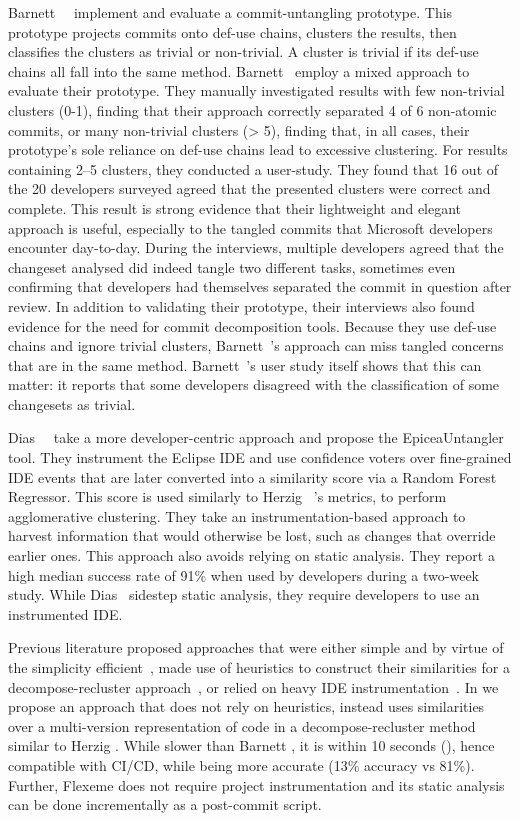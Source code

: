 Barnett~\etal~\cite{Barnett2015} implement and evaluate a commit-untangling
prototype. This prototype projects commits onto def-use chains, clusters the
results, then classifies the clusters as trivial or non-trivial. A cluster is
trivial if its def-use chains all fall into the same method. Barnett~\etal
employ a mixed approach to evaluate their prototype. They manually investigated
results with few non-trivial clusters (0-1), finding that their approach
correctly separated 4 of 6 non-atomic commits,  or many non-trivial clusters (>
5), finding that, in all cases, their prototype's sole reliance on def-use
chains lead to excessive clustering. For results containing 2--5 clusters, they
conducted a user-study. They found that 16 out of the 20 developers surveyed
agreed that the presented clusters were correct and complete. This result is
strong evidence that their lightweight and elegant approach is useful,
especially to the tangled commits that Microsoft developers encounter
day-to-day. During the interviews, multiple developers agreed that the changeset
analysed did indeed tangle two different tasks, sometimes even confirming that
developers had themselves separated the commit in question after review. In
addition to validating their prototype, their interviews also found evidence for
the need for commit decomposition tools. Because they use def-use chains and
ignore trivial clusters, Barnett~\etal's approach can miss tangled concerns that
are in the same method. Barnett~\etal's user study itself shows that this can
matter: it reports that some developers disagreed with the classification of
some changesets as trivial.

Dias~\etal~\cite{Dias2015} take a more developer-centric approach and propose
the EpiceaUntangler tool. They instrument the Eclipse IDE and use confidence
voters over fine-grained IDE events that are later converted into a similarity
score via a Random Forest Regressor. This score is used similarly to Herzig
\etal~\cite{Herzig2016}'s metrics, \ie to perform agglomerative clustering. They
take an instrumentation-based approach to harvest information that would
otherwise be lost, such as changes that override earlier ones. This approach
also avoids relying on static analysis. They report a high median success rate
of 91\% when used by developers during a two-week study. While Dias~\etal
sidestep static analysis, they require developers to use an instrumented IDE.

Previous literature proposed approaches that were either simple and by virtue of
the simplicity efficient~\cite{Barnett2015}, made use of heuristics to construct
their similarities for a decompose-recluster approach~\cite{Herzig2016}, or
relied on heavy IDE instrumentation~\cite{Dias2015}. In 
we propose an approach that does not rely on heuristics, instead uses
similarities over a multi-version representation of code in a
decompose-recluster method similar to Herzig \etal. While slower than Barnett
\etal, it is within 10 seconds (), hence compatible
with CI/CD, while being more accurate (13\% accuracy vs 81\%). Further, Flexeme
does not require project instrumentation and its static analysis can be done
incrementally as a post-commit script.


